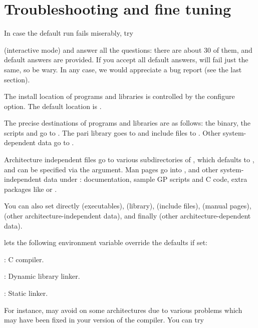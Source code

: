 \section{Troubleshooting and fine tuning}
In case the default  run fails miserably, try


\noindent (interactive mode) and answer all the questions: there are about 30
of them, and default answers are provided. If you accept all default answers,
 will fail just the same, so be wary. In any case, we would
appreciate a bug report (see the last section).

 The install location of programs and
libraries is controlled by the  configure option. The default
location is .

The precise destinations of programs and libraries are as
follows: the  binary, the scripts  and  go
to . The pari library goes to  and
include files to . Other system-dependent data go
to .

Architecture independent files go to various subdirectories of
, which defaults to , and can be
specified via the  argument. Man pages go into
, and other system-independent data
under : documentation,
sample GP scripts and C code, extra packages like  or
.

\noindent You can also set directly  (executables),
 (library),  (include files), 
(manual pages),  (other architecture-independent data), and
finally  (other architecture-dependent data).

  lets the following environment
variable override the defaults if set:

: C compiler.

: Dynamic library linker.

: Static linker.

\noindent For instance,  may avoid  on some
architectures due to various problems which may have been fixed in your
version of the compiler. You can try

